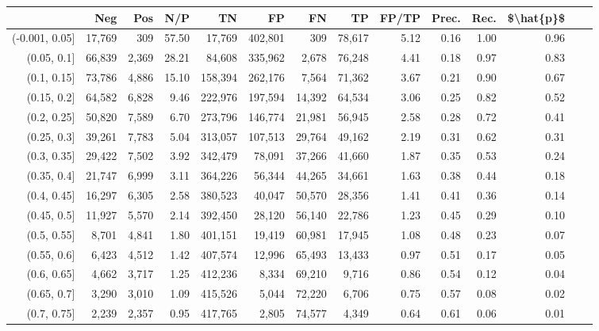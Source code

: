 \begin{tabular}{rrrrrrrrrrrrrr}
\toprule
{} &     Neg &    Pos &    N/P &       TN &       FP &      FN &      TP & FP/TP & Prec. &  Rec. & \$\textbackslash hat\{p\}\$ \\
\midrule
(-0.001, 0.05] &  17,769 &    309 &  57.50 &   17,769 &  402,801 &     309 &  78,617 &  5.12 &  0.16 &  1.00 &      0.96 \\
(0.05, 0.1]    &  66,839 &  2,369 &  28.21 &   84,608 &  335,962 &   2,678 &  76,248 &  4.41 &  0.18 &  0.97 &      0.83 \\
(0.1, 0.15]    &  73,786 &  4,886 &  15.10 &  158,394 &  262,176 &   7,564 &  71,362 &  3.67 &  0.21 &  0.90 &      0.67 \\
(0.15, 0.2]    &  64,582 &  6,828 &   9.46 &  222,976 &  197,594 &  14,392 &  64,534 &  3.06 &  0.25 &  0.82 &      0.52 \\
(0.2, 0.25]    &  50,820 &  7,589 &   6.70 &  273,796 &  146,774 &  21,981 &  56,945 &  2.58 &  0.28 &  0.72 &      0.41 \\
(0.25, 0.3]    &  39,261 &  7,783 &   5.04 &  313,057 &  107,513 &  29,764 &  49,162 &  2.19 &  0.31 &  0.62 &      0.31 \\
(0.3, 0.35]    &  29,422 &  7,502 &   3.92 &  342,479 &   78,091 &  37,266 &  41,660 &  1.87 &  0.35 &  0.53 &      0.24 \\
(0.35, 0.4]    &  21,747 &  6,999 &   3.11 &  364,226 &   56,344 &  44,265 &  34,661 &  1.63 &  0.38 &  0.44 &      0.18 \\
(0.4, 0.45]    &  16,297 &  6,305 &   2.58 &  380,523 &   40,047 &  50,570 &  28,356 &  1.41 &  0.41 &  0.36 &      0.14 \\
(0.45, 0.5]    &  11,927 &  5,570 &   2.14 &  392,450 &   28,120 &  56,140 &  22,786 &  1.23 &  0.45 &  0.29 &      0.10 \\
(0.5, 0.55]    &   8,701 &  4,841 &   1.80 &  401,151 &   19,419 &  60,981 &  17,945 &  1.08 &  0.48 &  0.23 &      0.07 \\
(0.55, 0.6]    &   6,423 &  4,512 &   1.42 &  407,574 &   12,996 &  65,493 &  13,433 &  0.97 &  0.51 &  0.17 &      0.05 \\
(0.6, 0.65]    &   4,662 &  3,717 &   1.25 &  412,236 &    8,334 &  69,210 &   9,716 &  0.86 &  0.54 &  0.12 &      0.04 \\
(0.65, 0.7]    &   3,290 &  3,010 &   1.09 &  415,526 &    5,044 &  72,220 &   6,706 &  0.75 &  0.57 &  0.08 &      0.02 \\
(0.7, 0.75]    &   2,239 &  2,357 &   0.95 &  417,765 &    2,805 &  74,577 &   4,349 &  0.64 &  0.61 &  0.06 &      0.01 \\

\end{tabular}

